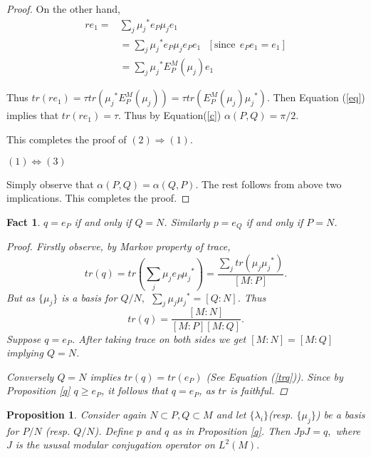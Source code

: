 \documentclass[11pt,letterpaper]{amsart}
\newtheorem{proposition}[theorem]{Proposition}
\newtheorem{fact}[theorem]{Fact}
\theoremstyle{definition}
\theoremstyle{remark}
\begin{document}
\begin{proof}
On the other hand,
\begin{align*}
 re_1= & \sum_j {\mu_j}^* e_P \mu_j e_1\\
 & = \sum_j {\mu_j}^* e_P \mu_j e_P e_1~~~[\textrm{since}~~e_Pe_1= e_1]\\
 &= \sum_j {\mu_j}^* E^M_P(\mu_j) e_1
\end{align*}

Thus $tr(re_1)= \tau tr({\mu_j}^* E^M_P(\mu_j))= \tau tr(E^M_P(\mu_j) {\mu_j}^*)$. Then Equation (\ref{eq}) implies that $tr(re_1)= \tau.$
Thus by Equation(\ref{c}) $\alpha(P,Q)= \pi/2.$ 


This completes the proof of $(2)\Rightarrow (1)$.
\bigskip


$(1)\Leftrightarrow (3)$
\smallskip


Simply observe that $\alpha(P,Q)= \alpha(Q,P)$. The rest follows from above two implications.
This completes the proof.
\end{proof}
\bigskip



\begin{fact}
   $q=e_P$ if and only if $Q=N$. Similarly $p=e_Q$ if and only if $P=N$.
 \begin{proof}
 Firstly observe, by Markov property of trace,
 $$tr(q)= tr(\sum_j \mu_j e_P {\mu_j}^*)= \frac{\sum_j tr(\mu_j {\mu_j}^*)}{[M:P]}.$$
But as $\{\mu_j\}$ is a basis for $Q/N,~~ \sum_j\mu_j {\mu_j}^*= [Q:N]$. Thus
\begin{equation}\label{trq}
tr(q)= \frac{[M:N]}{[M:P][M:Q]}.
\end{equation}
Suppose $q= e_P$. After taking trace  on both sides we get $ [M:N]= [M:Q]$ implying $Q=N$.


Conversely $Q=N$ implies $tr(q)= tr(e_P)$ (See Equation (\ref{trq})). Since by Proposition \ref{q} $q\geq e_P$, it follows that $q=e_P$, as $tr$ is faithful.
\end{proof}


\end{fact}



\begin{proposition}\label{J}
  Consider again $N\subset P,Q\subset M$ and let $\{\lambda_i\}$(resp. $\{\mu_j\}$) be a basis for $P/N$ (resp. $Q/N$). Define $p$ and $q$ as in Proposition \ref{q}. Then $JpJ=q,$ where $J$ is the ususal modular conjugation operator on $L^2(M).$ 
\end{proposition}
\end{document}
